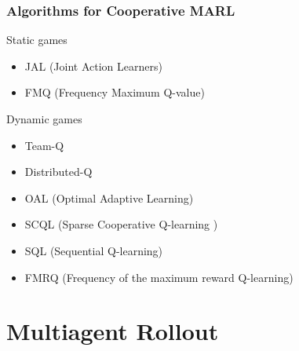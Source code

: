 \documentclass{beamer}
\begin{document}
    \begin{frame}
        \frametitle{Algorithms for Cooperative MARL}

        \begin{block}{Static games}
            \begin{itemize}
                \item JAL (Joint Action Learners)
                \item FMQ (Frequency Maximum Q-value)
            \end{itemize}

        \end{block}

        \begin{block}{Dynamic games}
            \begin{itemize}
                \item Team-Q
                \item Distributed-Q
                \item OAL (Optimal Adaptive Learning)
                \item SCQL (Sparse Cooperative Q-learning )
                \item SQL (Sequential Q-learning)
                \item FMRQ (Frequency of the maximum reward Q-learning)
            \end{itemize}
        \end{block}

    \end{frame}





























    \section{Multiagent Rollout}
\end{document}
